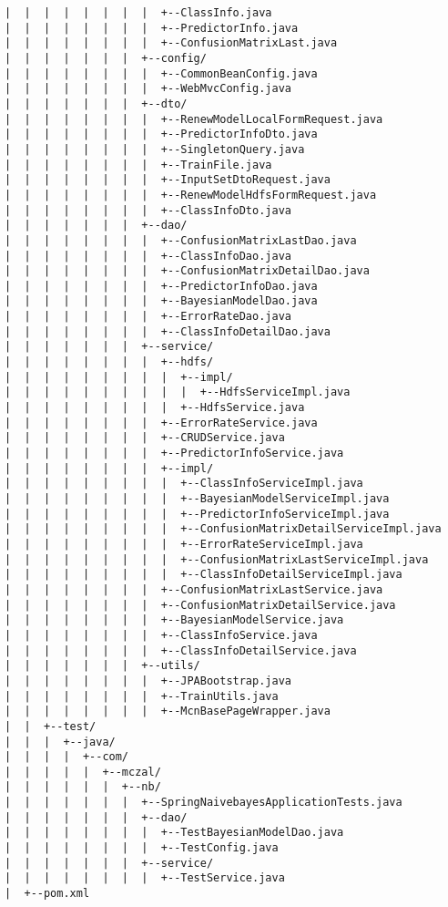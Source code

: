 \begin{lstlisting}
|  |  |  |  |  |  |  |  +--ClassInfo.java
|  |  |  |  |  |  |  |  +--PredictorInfo.java
|  |  |  |  |  |  |  |  +--ConfusionMatrixLast.java
|  |  |  |  |  |  |  +--config/
|  |  |  |  |  |  |  |  +--CommonBeanConfig.java
|  |  |  |  |  |  |  |  +--WebMvcConfig.java
|  |  |  |  |  |  |  +--dto/
|  |  |  |  |  |  |  |  +--RenewModelLocalFormRequest.java
|  |  |  |  |  |  |  |  +--PredictorInfoDto.java
|  |  |  |  |  |  |  |  +--SingletonQuery.java
|  |  |  |  |  |  |  |  +--TrainFile.java
|  |  |  |  |  |  |  |  +--InputSetDtoRequest.java
|  |  |  |  |  |  |  |  +--RenewModelHdfsFormRequest.java
|  |  |  |  |  |  |  |  +--ClassInfoDto.java
|  |  |  |  |  |  |  +--dao/
|  |  |  |  |  |  |  |  +--ConfusionMatrixLastDao.java
|  |  |  |  |  |  |  |  +--ClassInfoDao.java
|  |  |  |  |  |  |  |  +--ConfusionMatrixDetailDao.java
|  |  |  |  |  |  |  |  +--PredictorInfoDao.java
|  |  |  |  |  |  |  |  +--BayesianModelDao.java
|  |  |  |  |  |  |  |  +--ErrorRateDao.java
|  |  |  |  |  |  |  |  +--ClassInfoDetailDao.java
|  |  |  |  |  |  |  +--service/
|  |  |  |  |  |  |  |  +--hdfs/
|  |  |  |  |  |  |  |  |  +--impl/
|  |  |  |  |  |  |  |  |  |  +--HdfsServiceImpl.java
|  |  |  |  |  |  |  |  |  +--HdfsService.java
|  |  |  |  |  |  |  |  +--ErrorRateService.java
|  |  |  |  |  |  |  |  +--CRUDService.java
|  |  |  |  |  |  |  |  +--PredictorInfoService.java
|  |  |  |  |  |  |  |  +--impl/
|  |  |  |  |  |  |  |  |  +--ClassInfoServiceImpl.java
|  |  |  |  |  |  |  |  |  +--BayesianModelServiceImpl.java
|  |  |  |  |  |  |  |  |  +--PredictorInfoServiceImpl.java
|  |  |  |  |  |  |  |  |  +--ConfusionMatrixDetailServiceImpl.java
|  |  |  |  |  |  |  |  |  +--ErrorRateServiceImpl.java
|  |  |  |  |  |  |  |  |  +--ConfusionMatrixLastServiceImpl.java
|  |  |  |  |  |  |  |  |  +--ClassInfoDetailServiceImpl.java
|  |  |  |  |  |  |  |  +--ConfusionMatrixLastService.java
|  |  |  |  |  |  |  |  +--ConfusionMatrixDetailService.java
|  |  |  |  |  |  |  |  +--BayesianModelService.java
|  |  |  |  |  |  |  |  +--ClassInfoService.java
|  |  |  |  |  |  |  |  +--ClassInfoDetailService.java
|  |  |  |  |  |  |  +--utils/
|  |  |  |  |  |  |  |  +--JPABootstrap.java
|  |  |  |  |  |  |  |  +--TrainUtils.java
|  |  |  |  |  |  |  |  +--McnBasePageWrapper.java
|  |  +--test/
|  |  |  +--java/
|  |  |  |  +--com/
|  |  |  |  |  +--mczal/
|  |  |  |  |  |  +--nb/
|  |  |  |  |  |  |  +--SpringNaivebayesApplicationTests.java
|  |  |  |  |  |  |  +--dao/
|  |  |  |  |  |  |  |  +--TestBayesianModelDao.java
|  |  |  |  |  |  |  |  +--TestConfig.java
|  |  |  |  |  |  |  +--service/
|  |  |  |  |  |  |  |  +--TestService.java
|  +--pom.xml
\end{lstlisting}

